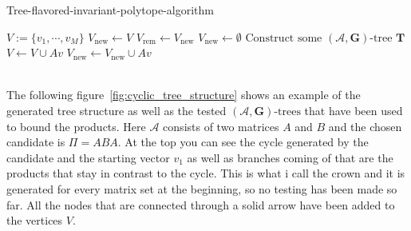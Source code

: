 \vspace{1cm}

\begin{algorithm}
  \caption{Tree-flavored-invariant-polytope-algorithm}
  \label{alg:hybrid}
  \begin{algorithmic}
      \State $V := \{v_1, \cdots, v_M\}$
      \State $V_{\text{new}} \gets V$
          \State $V_{\text{rem}} \gets V_{\text{new}}$
          \State $V_{\text{new}} \gets \emptyset$
              \State $\text{Construct some } (\mathcal{A},\mathbf{G})\text{-tree } \mathbf{T}$
                      \State $V \gets V \cup Av$
                      \State $V_{\text{new}} \gets V_{\text{new}} \cup Av$
                  \EndIf
              \EndFor
          \EndFor
      \EndWhile \\
      \Return \\
  \end{algorithmic}
\end{algorithm}

\vspace{1cm}

The following figure~\ref{fig:cyclic_tree_structure} shows an example of the generated tree structure as well as the tested $(\mathcal{A},\mathbf{G})\text{-trees}$ that have been used to bound the products. Here $\mathcal{A}$ consists of two matrices $A$ and $B$ and the chosen candidate is $ \Pi = ABA$. At the top you can see the cycle generated by the candidate and the starting vector $v_1$ as well as branches coming of that are the products that stay in contrast to the cycle. This is what i call the crown and it is generated for every matrix set at the beginning, so no testing has been made so far. All the nodes that are connected through a solid arrow have been added to the vertices $V$.

